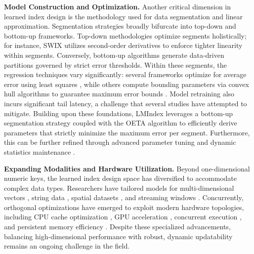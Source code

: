 \textbf{Model Construction and Optimization.}
Another critical dimension in learned index design is the methodology used for data segmentation and linear approximation. Segmentation strategies broadly bifurcate into top-down \cite{case18, alex20, swix24, carmi22} and bottom-up \cite{fiting-tree19, pgm20, bourbon20} frameworks. Top-down methodologies optimize segments holistically; for instance, SWIX \cite{swix24} utilizes second-order derivatives to enforce tighter linearity within segments. Conversely, bottom-up algorithms generate data-driven partitions governed by strict error thresholds. Within these segments, the regression techniques vary significantly: several frameworks optimize for average error using least squares \cite{alex20, sindex20, finedex21, swix24}, while others compute bounding parameters via convex hull algorithms to guarantee maximum error bounds \cite{pgm20, madex20, towards21}. Model retraining also incurs significant tail latency, a challenge that several studies \cite{chameleon24, vega25, hire25} have attempted to mitigate. Building upon these foundations, LMIndex leverages a bottom-up segmentation strategy coupled with the OETA algorithm to efficiently derive parameters that strictly minimize the maximum error per segment. Furthermore, this can be further refined through advanced parameter tuning \cite{tuning22, airindex23, newtuning25} and dynamic statistics maintenance \cite{sali23}.

\textbf{Expanding Modalities and Hardware Utilization.}
Beyond one-dimensional numeric keys, the learned index design space has diversified to accommodate complex data types. Researchers have tailored models for multi-dimensional vectors \cite{flood20, Tsunami20, coax23, learnedaknn22}, string data \cite{sindex20, rss21, lits24}, spatial datasets \cite{ifx20, lisa20, wisk23}, and streaming windows \cite{flirt23}. Concurrently, orthogonal optimizations have emerged to exploit modern hardware topologies, including CPU cache optimization \cite{carmi22}, GPU acceleration \cite{hyper24}, concurrent execution \cite{xindex20, finedex21}, and persistent memory efficiency \cite{apex21, simple23, learnedpmem23, disklearned24, wipe24, making24}. Despite these specialized advancements, balancing high-dimensional performance with robust, dynamic updatability remains an ongoing challenge in the field.
